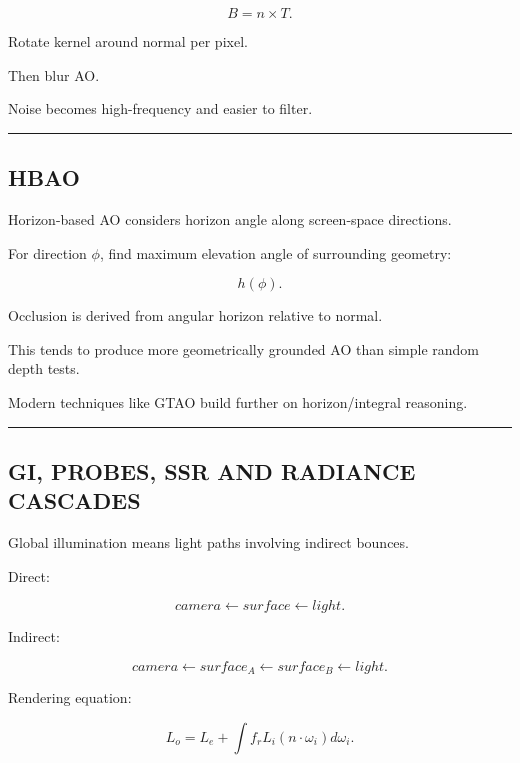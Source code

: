 \[
B=n\times T.
\]

Rotate kernel around normal per pixel.

Then blur AO.

Noise becomes high-frequency and easier to filter.

\begin{center}\rule{0.5\linewidth}{0.5pt}\end{center}

\subsection{HBAO}\label{04-visual-computing-ii-ch040-hbao}

\hypertarget{04-visual-computing-ii-ch040-hbao}{}

Horizon-based AO considers horizon angle along screen-space directions.

For direction \(\phi\), find maximum elevation angle of surrounding geometry:

\[
h(\phi).
\]

Occlusion is derived from angular horizon relative to normal.

This tends to produce more geometrically grounded AO than simple random depth tests.

Modern techniques like GTAO build further on horizon/integral reasoning.

\begin{center}\rule{0.5\linewidth}{0.5pt}\end{center}

\subsection{GI, PROBES, SSR AND RADIANCE CASCADES}\label{04-visual-computing-ii-ch040-gi-probes-ssr-and-radiance-cascades}

\hypertarget{04-visual-computing-ii-ch040-gi-probes-ssr-and-radiance-cascades}{}

Global illumination means light paths involving indirect bounces.

Direct:

\[
camera
\leftarrow
surface
\leftarrow
light.
\]

Indirect:

\[
camera
\leftarrow
surface_A
\leftarrow
surface_B
\leftarrow
light.
\]

Rendering equation:

\[
L_o=
L_e+
\int
f_rL_i(n\cdot\omega_i)d\omega_i.
\]

